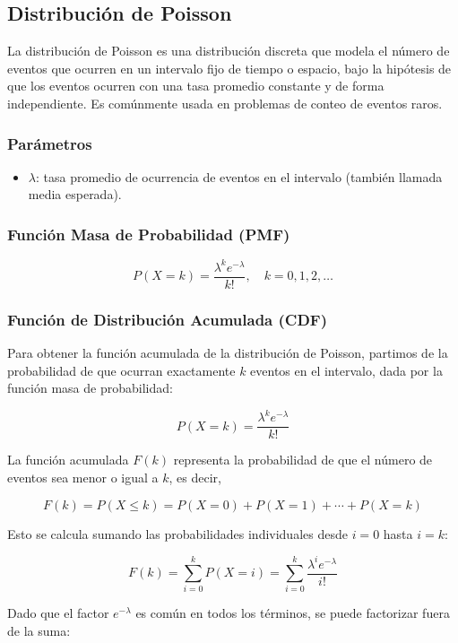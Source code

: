 \documentclass{article}
\begin{document}
\subsection{Distribución de Poisson}

La distribución de Poisson es una distribución discreta que modela el número de eventos que ocurren en un intervalo fijo de tiempo o espacio, bajo la hipótesis de que los eventos ocurren con una tasa promedio constante y de forma independiente. Es comúnmente usada en problemas de conteo de eventos raros.

\subsubsection*{Parámetros}
\begin{itemize}
  \item $\lambda$: tasa promedio de ocurrencia de eventos en el intervalo (también llamada media esperada).
\end{itemize}

\subsubsection*{Función Masa de Probabilidad (PMF)}
\[
P(X = k) = \frac{\lambda^k e^{-\lambda}}{k!}, \quad k = 0, 1, 2, \ldots
\]

\subsubsection*{Función de Distribución Acumulada (CDF)}

Para obtener la función acumulada de la distribución de Poisson, partimos de la probabilidad de que ocurran exactamente \(k\) eventos en el intervalo, dada por la función masa de probabilidad:

\[
P(X = k) = \frac{\lambda^k e^{-\lambda}}{k!}
\]

La función acumulada \(F(k)\) representa la probabilidad de que el número de eventos sea menor o igual a \(k\), es decir,

\[
F(k) = P(X \leq k) = P(X=0) + P(X=1) + \cdots + P(X=k)
\]

Esto se calcula sumando las probabilidades individuales desde \(i=0\) hasta \(i=k\):

\[
F(k) = \sum_{i=0}^k P(X = i) = \sum_{i=0}^k \frac{\lambda^i e^{-\lambda}}{i!}
\]

Dado que el factor \(e^{-\lambda}\) es común en todos los términos, se puede factorizar fuera de la suma:
\end{document}
